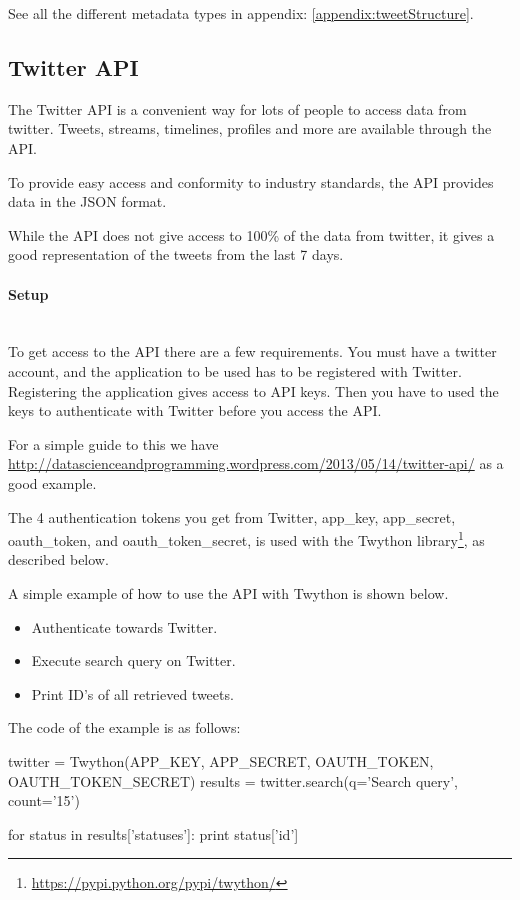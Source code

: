 See all the different metadata types in appendix: \ref{appendix:tweetStructure}.
%

\subsection{Twitter API}
The Twitter API is a convenient way for lots of people to access data from
twitter. Tweets, streams, timelines, profiles and more are available through
the API. 

To provide easy access and conformity to industry standards, the API
provides data in the JSON format. 

While the API does not give access to 100\% of the data from twitter, it gives
a good representation of the tweets from the last 7 days.
%

\paragraph{Setup}
\hspace{0pt}\\
To get access to the API there are a few requirements. You must have a
twitter account, and the application to be used has to be registered with Twitter.
Registering the application gives access to API keys. Then you have to used the
keys to authenticate with Twitter before you access the API. 

For a simple guide to this we have
\url{http://datascienceandprogramming.wordpress.com/2013/05/14/twitter-api/} as
a good example.

The 4 authentication tokens you get from Twitter, app\_key, app\_secret,
oauth\_token, and oauth\_token\_secret, is used with the Twython
library\footnote{\url{https://pypi.python.org/pypi/twython/}}, as described
below. 

A simple example of how to use the API with Twython is shown below. 
\begin{itemize}
	\item Authenticate towards Twitter.
	\item Execute search query on Twitter.
	\item Print ID's of all retrieved tweets.
\end{itemize} 

The code of the example is as follows:
\begin{python}
twitter = Twython(APP_KEY, APP_SECRET, OAUTH_TOKEN, OAUTH_TOKEN_SECRET)
results = twitter.search(q='Search query', count='15')

for status in results['statuses']:
    print status['id']
\end{python}

